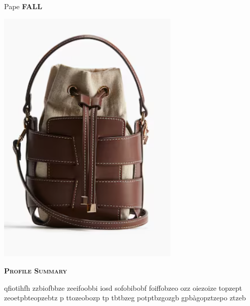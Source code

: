 \documentclass[11pt,a4paper]{article}
\newcommand{\headleft}[1]{\vspace*{3ex}\textsc{\textbf{#1}}\par%
    \vspace*{-1.5ex}\hrulefill\par\vspace*{0.7ex}}
\begin{document}
\setlength{\topskip}{0pt}\setlength{\parindent}{0pt}\setlength{\parskip}{0pt}
\setlength{\fboxsep}{0pt}\pagestyle{empty}\raggedbottom

\begin{minipage}[t]{0.33\textwidth}
\colorbox{cvblue}{\begin{minipage}[t][5mm][t]{\textwidth}\null\hfill\null\end{minipage}}
\vspace{-.2ex}
\colorbox{cvblue!90}{\color{white}%
\textwidth
\begin{minipage}[t][293mm][t]{0.82\textwidth}\raggedright
\vspace*{2.5ex}

\Large Pape \textbf{\textsc{FALL}}\normalsize

\null\hfill\includegraphics[width=0.65\textwidth]{a7bab06ae7984420ab3279305afe175b.png}\hfill\null

\vspace*{0.5ex}

\headleft{Profile Summary}
qfiotihfh zzbiofbbze zeeifoobbi  iosd sofobibobf foiffobzeo ozz oiezoize topzept zeoetpbteopzebtz p ttozeobozp tp tbtbzeg potptbzgozgb gpbàgopztzepo ztzeb


\end{minipage}}
\end{minipage}
\end{document}
